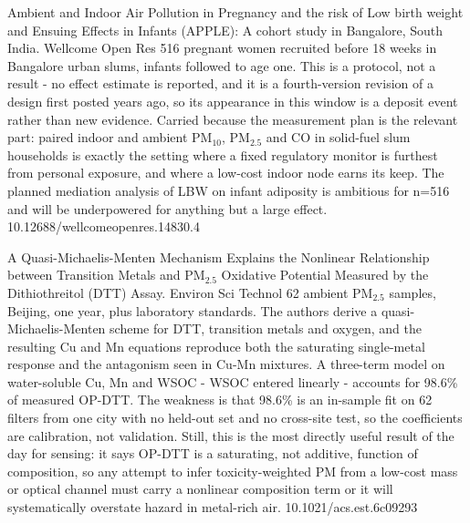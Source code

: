 \documentclass[10pt]{article}
\begin{document}
{Ambient and Indoor Air Pollution in Pregnancy and the risk of Low birth weight and Ensuing Effects in Infants (APPLE): A cohort study in Bangalore, South India.}
{Wellcome Open Res}
{516 pregnant women recruited before 18 weeks in Bangalore urban slums, infants followed to age one. This is a protocol, not a result - no effect estimate is reported, and it is a fourth-version revision of a design first posted years ago, so its appearance in this window is a deposit event rather than new evidence. Carried because the measurement plan is the relevant part: paired indoor and ambient PM$_{10}$, PM$_{2.5}$ and CO in solid-fuel slum households is exactly the setting where a fixed regulatory monitor is furthest from personal exposure, and where a low-cost indoor node earns its keep. The planned mediation analysis of LBW on infant adiposity is ambitious for n=516 and will be underpowered for anything but a large effect.}
{10.12688/wellcomeopenres.14830.4}


{A Quasi-Michaelis-Menten Mechanism Explains the Nonlinear Relationship between Transition Metals and PM$_{2.5}$ Oxidative Potential Measured by the Dithiothreitol (DTT) Assay.}
{Environ Sci Technol}
{62 ambient PM$_{2.5}$ samples, Beijing, one year, plus laboratory standards. The authors derive a quasi-Michaelis-Menten scheme for DTT, transition metals and oxygen, and the resulting Cu and Mn equations reproduce both the saturating single-metal response and the antagonism seen in Cu-Mn mixtures. A three-term model on water-soluble Cu, Mn and WSOC - WSOC entered linearly - accounts for 98.6\% of measured OP-DTT. The weakness is that 98.6\% is an in-sample fit on 62 filters from one city with no held-out set and no cross-site test, so the coefficients are calibration, not validation. Still, this is the most directly useful result of the day for sensing: it says OP-DTT is a saturating, not additive, function of composition, so any attempt to infer toxicity-weighted PM from a low-cost mass or optical channel must carry a nonlinear composition term or it will systematically overstate hazard in metal-rich air.}
{10.1021/acs.est.6c09293}

\end{document}
